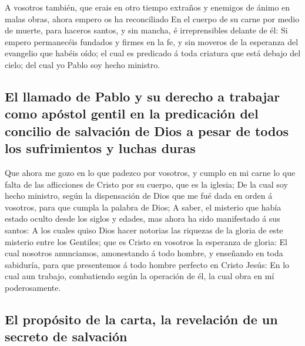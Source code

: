  A vosotros también, que erais en otro tiempo extraños y
enemigos de ánimo en malas obras, ahora empero os ha reconciliado
 En el cuerpo de su carne por medio de muerte, para haceros
santos, y sin mancha, é irreprensibles delante de él:  Si
empero permanecéis fundados y firmes en la fe, y sin moveros de la
esperanza del evangelio que habéis oído; el cual es predicado á toda
criatura que está debajo del cielo; del cual yo Pablo soy hecho
ministro.

\hypertarget{el-llamado-de-pablo-y-su-derecho-a-trabajar-como-apuxf3stol-gentil-en-la-predicaciuxf3n-del-concilio-de-salvaciuxf3n-de-dios-a-pesar-de-todos-los-sufrimientos-y-luchas-duras}{%
\subsection{El llamado de Pablo y su derecho a trabajar como apóstol
gentil en la predicación del concilio de salvación de Dios a pesar de
todos los sufrimientos y luchas
duras}\label{el-llamado-de-pablo-y-su-derecho-a-trabajar-como-apuxf3stol-gentil-en-la-predicaciuxf3n-del-concilio-de-salvaciuxf3n-de-dios-a-pesar-de-todos-los-sufrimientos-y-luchas-duras}}

 Que ahora me gozo en lo que padezco por vosotros, y cumplo
en mi carne lo que falta de las aflicciones de Cristo por su cuerpo, que
es la iglesia;  De la cual soy hecho ministro, según la
dispensación de Dios que me fué dada en orden á vosotros, para que
cumpla la palabra de Dios;  A saber, el misterio que había
estado oculto desde los siglos y edades, mas ahora ha sido manifestado á
sus santos:  A los cuales quiso Dios hacer notorias las
riquezas de la gloria de este misterio entre los Gentiles; que es Cristo
en vosotros la esperanza de gloria:  El cual nosotros
anunciamos, amonestando á todo hombre, y enseñando en toda sabiduría,
para que presentemos á todo hombre perfecto en Cristo Jesús:
 En lo cual aun trabajo, combatiendo según la operación de
él, la cual obra en mí poderosamente.

\hypertarget{el-propuxf3sito-de-la-carta-la-revelaciuxf3n-de-un-secreto-de-salvaciuxf3n}{%
\subsection{El propósito de la carta, la revelación de un secreto de
salvación}\label{el-propuxf3sito-de-la-carta-la-revelaciuxf3n-de-un-secreto-de-salvaciuxf3n}}

